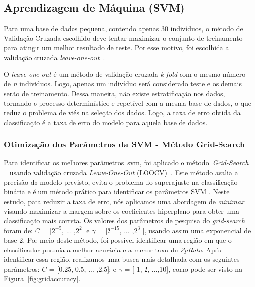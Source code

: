 \subsection{Aprendizagem de Máquina (SVM)}

Para uma base de dados pequena, contendo apenas 30 indivíduos, o método de Validação Cruzada escolhido deve tentar maximizar o conjunto de treinamento para atingir um melhor resultado de teste. Por esse motivo, foi escolhida a validação cruzada \textit{leave-one-out}~\cite{kantardzic2011data}. 

O \textit{leave-one-out} é um método de validação cruzada \textit{k-fold} com o mesmo número de \textit{n} indivíduos. Logo, apenas um indivíduo será considerado teste e os demais serão de treinamento. Dessa maneira, não existe estratificação nos dados, tornando o processo determinístico e repetível com a mesma base de dados, o que reduz o problema de viés na seleção dos dados. Logo, a taxa de erro obtida da classificação é a taxa de erro do modelo para aquela base de dados. 

\subsubsection{Otimização dos Parâmetros da SVM - Método Grid-Search}

Para identificar os melhores parâmetros~\ac{svm}, foi aplicado o método~\textit{Grid-Search} ~\cite{gridsearchsvm2010} usando validação cruzada \textit{Leave-One-Out} (LOOCV)~\cite{kantardzic2011data}. Este método avalia a precisão do modelo previsto, evita o problema do superajuste na classificação binária e é um método prático para identificar os parâmetros SVM . Neste estudo, para reduzir a taxa de erro, nós aplicamos uma abordagem de \textit{minimax} visando maximizar a margem sobre os coeficientes hiperplano para obter uma classificação mais correta. Os valores dos parâmetros de pesquisa do \textit{grid-search} foram de: $C$ = [$2^{-5}$, ... ,$2^2$] e $\gamma$ = [$2^{-15}$, ... ,$2^3$ ], usando assim uma exponencial de base 2. Por meio deste método, foi possível identificar uma região em que o classificador possuía a melhor acurácia e a menor taxa de \textit{FpRate}. Após identificar essa região, realizamos uma busca mais detalhada com os seguintes parâmetros: $C$ = [0.25, 0.5, ... ,2.5]; e $\gamma$ = [
1, 2, ...,10], como pode ser visto na Figura~\ref{fig:gridaccuracy}.



